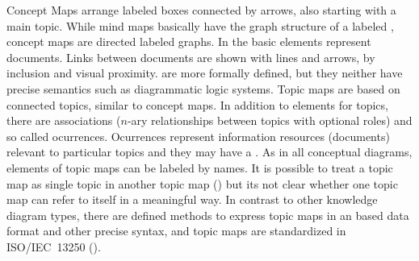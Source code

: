  Concept Maps \cite{Novak2006} arrange labeled
boxes connected by arrows, also starting with a main topic. While mind maps
basically have the graph structure of a labeled , concept maps are
directed labeled graphs. In  \cite{Marshall1995} the
basic elements represent documents. Links between documents are shown with
lines and arrows, by inclusion and visual proximity.  \cite{Pepper2010} are more formally defined, but they neither have
precise semantics such as diagrammatic logic systems. Topic maps are based on
connected topics, similar to concept maps. In addition to elements for topics,
there are associations ($n$-ary relationships between topics with optional
roles) and so called ocurrences. Ocurrences represent information resources
(documents) relevant to particular topics and they may have a .
As in all conceptual diagrams, elements of topic maps can be labeled by names.
It is possible to treat a topic map as single topic in another topic map
() but its not clear whether one topic map can refer to itself
in a meaningful way. In contrast to other knowledge diagram types, there are
defined methods to express topic maps in an  based data format and
other precise syntax, and topic maps are standardized in ISO/IEC~13250
(\citeyear{ISO13250}).







